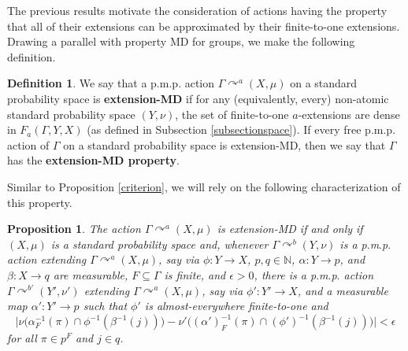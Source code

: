 \documentclass[12pt]{amsart}
\newtheorem{prop}[thm]{Proposition}
\theoremstyle{definition}
\newtheorem{defn}[thm]{Definition}
\def\bb{\mathbb}
\def\bb{\mathbb}
\newcommand{\pmp}{p{$.$}m{$.$}p{$.$}}
\newcommand{\acts}{\curvearrowright}
\begin{document}
The previous results motivate the consideration of actions having the property that all of their extensions can be approximated by their finite-to-one extensions. Drawing a parallel with property MD for groups, we make the following definition.

\begin{defn} \label{def:weakMD}
We say that a {\pmp} action $\Gamma \acts^a (X, \mu)$ on a standard probability space is \textbf{extension-MD} if for any (equivalently, every) non-atomic standard probability space $(Y, \nu)$, the set of finite-to-one $a$-extensions are dense in $F_a(\Gamma, Y,X)$ (as defined in Subsection \ref{subsectionspace}). If every free {\pmp} action of $\Gamma$ on a standard probability space is extension-MD, then we say that $\Gamma$ has the \textbf{extension-MD property}.
\end{defn}

Similar to Proposition \ref{criterion}, we will rely on the following characterization of this property.

\begin{prop} \label{weakMDcriterion}
    The action $\Gamma \acts^a (X, \mu)$ is extension-MD if and only if $(X, \mu)$ is a standard probability space and, whenever $\Gamma \acts^b (Y, \nu)$ is a {\pmp} action extending $\Gamma \acts^a (X, \mu)$, say via $\phi : Y \rightarrow X$, $p, q \in \bb N$, $\alpha : Y \to p$, and $\beta : X \to q$ are measurable, $F \subseteq \Gamma$ is finite, and $\epsilon > 0$, there is a {\pmp} action $\Gamma \acts^{b'} (Y', \nu')$ extending $\Gamma \acts^a (X, \mu)$, say via $\phi' : Y' \rightarrow X$, and a measurable map $\alpha' : Y' \to p$ such that $\phi'$ is almost-everywhere finite-to-one and
    \begin{equation} \label{eqn:weakMDcriterion}
        \Big| \nu \Big(\alpha_F^{-1}(\pi) \cap \phi^{-1}(\beta^{-1}(j)) \Big) - \nu' \Big((\alpha')_F^{-1}(\pi) \cap (\phi')^{-1}(\beta^{-1}(j)) \Big) \Big| < \epsilon
    \end{equation}
    for all $\pi \in p^F$ and $j \in q$.
\end{prop}
\end{document}

